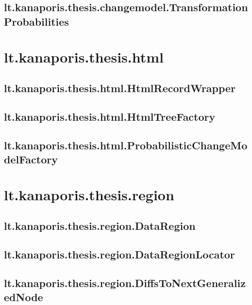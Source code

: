 \subsection{lt.kanaporis.thesis.changemodel.TransformationProbabilities}



\section{lt.kanaporis.thesis.html}

\subsection{lt.kanaporis.thesis.html.HtmlRecordWrapper}


\subsection{lt.kanaporis.thesis.html.HtmlTreeFactory}


\subsection{lt.kanaporis.thesis.html.ProbabilisticChangeModelFactory}



\section{lt.kanaporis.thesis.region}

\subsection{lt.kanaporis.thesis.region.DataRegion}


\subsection{lt.kanaporis.thesis.region.DataRegionLocator}


\subsection{lt.kanaporis.thesis.region.DiffsToNextGeneralizedNode}



